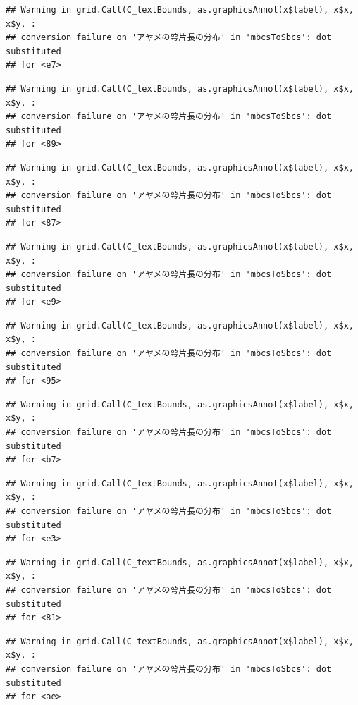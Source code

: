 \documentclass[
]{book}
\begin{document}
\begin{verbatim}
## Warning in grid.Call(C_textBounds, as.graphicsAnnot(x$label), x$x, x$y, :
## conversion failure on 'アヤメの萼片長の分布' in 'mbcsToSbcs': dot substituted
## for <e7>
\end{verbatim}

\begin{verbatim}
## Warning in grid.Call(C_textBounds, as.graphicsAnnot(x$label), x$x, x$y, :
## conversion failure on 'アヤメの萼片長の分布' in 'mbcsToSbcs': dot substituted
## for <89>
\end{verbatim}

\begin{verbatim}
## Warning in grid.Call(C_textBounds, as.graphicsAnnot(x$label), x$x, x$y, :
## conversion failure on 'アヤメの萼片長の分布' in 'mbcsToSbcs': dot substituted
## for <87>
\end{verbatim}

\begin{verbatim}
## Warning in grid.Call(C_textBounds, as.graphicsAnnot(x$label), x$x, x$y, :
## conversion failure on 'アヤメの萼片長の分布' in 'mbcsToSbcs': dot substituted
## for <e9>
\end{verbatim}

\begin{verbatim}
## Warning in grid.Call(C_textBounds, as.graphicsAnnot(x$label), x$x, x$y, :
## conversion failure on 'アヤメの萼片長の分布' in 'mbcsToSbcs': dot substituted
## for <95>
\end{verbatim}

\begin{verbatim}
## Warning in grid.Call(C_textBounds, as.graphicsAnnot(x$label), x$x, x$y, :
## conversion failure on 'アヤメの萼片長の分布' in 'mbcsToSbcs': dot substituted
## for <b7>
\end{verbatim}

\begin{verbatim}
## Warning in grid.Call(C_textBounds, as.graphicsAnnot(x$label), x$x, x$y, :
## conversion failure on 'アヤメの萼片長の分布' in 'mbcsToSbcs': dot substituted
## for <e3>
\end{verbatim}

\begin{verbatim}
## Warning in grid.Call(C_textBounds, as.graphicsAnnot(x$label), x$x, x$y, :
## conversion failure on 'アヤメの萼片長の分布' in 'mbcsToSbcs': dot substituted
## for <81>
\end{verbatim}

\begin{verbatim}
## Warning in grid.Call(C_textBounds, as.graphicsAnnot(x$label), x$x, x$y, :
## conversion failure on 'アヤメの萼片長の分布' in 'mbcsToSbcs': dot substituted
## for <ae>
\end{verbatim}
\end{document}
